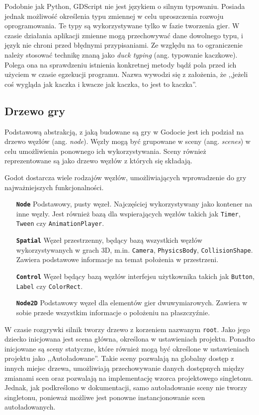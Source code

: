Podobnie jak Python, GDScript nie jest językiem o silnym typowaniu. Posiada jednak możliwość określenia typu zmiennej w celu uproszczenia rozwoju oprogramowania. Te typy są wykorzystywane tylko w fazie tworzenia gier. W czasie działania aplikacji zmienne mogą przechowywać dane dowolnego typu, i język nie chroni przed błędnymi przypisaniami. Ze względu na to ograniczenie należy stosować technikę znaną jako \emph{duck typing} (ang. typowanie kaczkowe). Polega ona na sprawdzeniu istnienia konkretnej metody bądź pola przed ich użyciem w czasie egzekucji programu. Nazwa wywodzi się z założenia, że ,,jeżeli coś wygląda jak kaczka i kwacze jak kaczka, to jest to kaczka''.

\subsection{Drzewo gry}
Podstawową abstrakcją, z jaką budowane są gry w Godocie jest ich podział na drzewo węzłów (ang. \emph{node}). Węzły mogą być grupowane w sceny (ang. \emph{scenes}) w celu umożliwienia ponownego ich wykorzystywania. Sceny również reprezentowane są jako drzewo węzłów z których się składają. 

Godot dostarcza wiele rodzajów węzłów, umożliwiających wprowadzenie do gry najważniejszych funkcjonalności. 

\begin{itemize}
    \item[\textbf{\texttt{Node}}] Podstawowy, pusty węzeł. Najczęściej wykorzystywany jako kontener na inne węzły. Jest również bazą dla wspierających węzłów takich jak \texttt{Timer}, \texttt{Tween} czy \texttt{AnimationPlayer}.
    \item[\textbf{\texttt{Spatial}}] Węzeł przestrzenny, będący bazą wszystkich węzłów wykorzystywanych w grach 3D, m.in. \texttt{Camera}, \texttt{PhysicsBody}, \texttt{CollisionShape}. Zawiera podstawowe informacje na temat położenia w przestrzeni.
    \item[\textbf{\texttt{Control}}] Węzeł będący bazą węzłów interfejsu użytkownika takich jak \texttt{Button}, \texttt{Label} czy \texttt{ColorRect}.
    \item[\textbf{\texttt{Node2D}}] Podstawowy węzeł dla elementów gier dwuwymiarowych. Zawiera w sobie przede wszystkim informacje o położeniu na płaszczyźnie. 
\end{itemize}

W czasie rozgrywki silnik tworzy drzewo z korzeniem nazwanym \texttt{root}. Jako jego dziecko inicjowana jest scena główna, określona w ustawieniach projektu. Ponadto inicjowane są sceny statyczne, które również mogą być określone w ustawieniach projektu jako ,,Autoładowane''. Takie sceny pozwalają na globalny dostęp z innych miejsc drzewa, umożliwiają przechowywanie danych dostępnych między zmianami scen oraz pozwalają na implementację wzorca projektowego singletonu\cite{singleton_refactoring_guru}. Jednak, jak podkreślono w dokumentacji, samo autoładowanie sceny nie tworzy singletonu, ponieważ możliwe jest ponowne instancjonowanie scen autoładowanych. 

